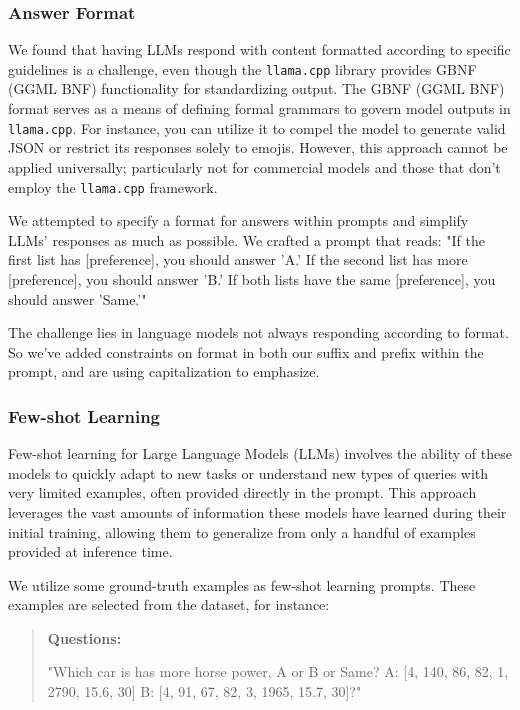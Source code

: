 \documentclass{ieeeaccess}
\newenvironment{Questions}{
    \begin{quote}
    \textbf{Questions:}
}{\end{quote}}
\begin{document}
\subsubsection{Answer Format}

We found that having LLMs respond with content formatted according to specific guidelines is a challenge, even though the \texttt{llama.cpp} library provides GBNF (GGML BNF) functionality for standardizing output. The GBNF (GGML BNF) format serves as a means of defining formal grammars to govern model outputs in \texttt{llama.cpp}. For instance, you can utilize it to compel the model to generate valid JSON or restrict its responses solely to emojis\cite{llamacpp}. However, this approach cannot be applied universally; particularly not for commercial models and those that don't employ the \texttt{llama.cpp} framework.

We attempted to specify a format for answers within prompts and simplify LLMs' responses as much as possible. We crafted a prompt that reads: "If the first list has [preference], you should answer 'A.' If the second list has more [preference], you should answer 'B.' If both lists have the same [preference], you should answer 'Same.'"

The challenge lies in language models not always responding according to format. So we've added constraints on format in both our suffix and prefix within the prompt, and are using capitalization to emphasize.

\subsubsection{Few-shot Learning}

Few-shot learning for Large Language Models (LLMs) involves the ability of these models to quickly adapt to new tasks or understand new types of queries with very limited examples, often provided directly in the prompt. This approach leverages the vast amounts of information these models have learned during their initial training, allowing them to generalize from only a handful of examples provided at inference time\cite{brown2020language}.

We utilize some ground-truth examples as few-shot learning prompts. These examples are selected from the dataset, for instance:

\begin{Questions}
    "Which car is has more horse power, A or B or Same? A: [4, 140, 86, 82, 1, 2790, 15.6, 30] B: [4, 91, 67, 82, 3, 1965, 15.7, 30]?"
\end{Questions}
\end{document}
